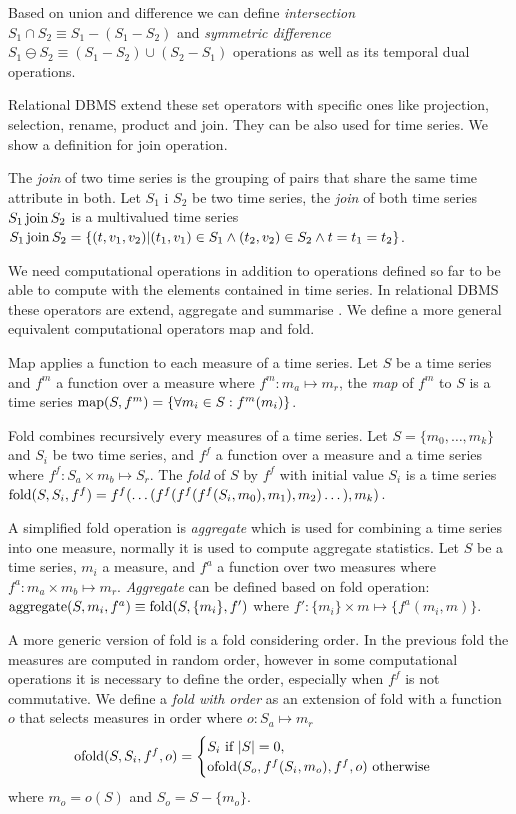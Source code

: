 Based on union and difference we can define \emph{intersection} $S_1\cap
S_2 \equiv S_1 - (S_1 - S_2)$ and \emph{symmetric difference} $S_1 \ominus
S_2 \equiv (S_1 - S_2) \cup (S_2 - S_1)$ operations as well as its
temporal dual operations.


Relational DBMS extend these set operators with specific ones like
projection, selection, rename, product and join. They can be also used
for time series. We show a definition for join operation.


The \emph{join} of two time series is the grouping of pairs that share
the same time attribute in both.  Let $S_1$ i $S_2$ be two time series,
the \emph{join} of both time series $S_1 \operatorname*{join} S_2$ is a multivalued
time series $S_1 \operatorname*{join} S_2 = \{ (t,v_1,v_2) | (t_1,v_1) \in S_1 \wedge
(t_2,v_2) \in S_2 \wedge t=t_1=t_2 \}$.


We need computational operations in addition to operations defined so
far to be able to compute with the elements contained in time
series. In relational DBMS these operators are extend, aggregate and
summarise \cite{date:introduction}. We define a more general
equivalent computational operators map and fold.


Map applies a function to each measure of a time series.  Let $S$ be a
time series and $f^m$ a function over a measure where $f^m:m_a\mapsto
m_r$, the \emph{map} of $f^m$ to $S$ is a time series $\operatorname*{map}(S,f^m) =
\{\forall m_i\in S : f^m(m_i) \}$.

Fold combines recursively every measures of a time series.  Let
$S=\{m_0, \dotsc, m_k\}$ and $S_i$ be two time series, and $f^f$ a
function over a measure and a time series where $f^f: S_a \times m_b
\mapsto S_r$. The \emph{fold} of $S$ by $f^f$ with initial value $S_i$ is a
time series $\operatorname*{fold}(S,S_i,f^f) = f^f(\dots(
f^f(f^f(f^f(S_i,m_0),\allowbreak m_1),\allowbreak m_2
)\dots),\allowbreak m_k)$.


A simplified fold operation is \emph{aggregate} which
is used for combining a time series into one measure, normally it is
used to compute aggregate statistics.  Let $S$ be a time series, $m_i$
a measure, and $f^a$ a function over two measures where $f^a: m_a
\times m_b \mapsto m_r$.  \emph{Aggregate} can be defined based on
fold operation: $\operatorname*{aggregate}(S,m_i,f^a) \equiv \operatorname*{fold}(S,\{m_i\},f')$ where $f':
\{m_i\} \times m \mapsto \{f^a(m_i,m)\}$.

A more generic version of fold is a fold considering order. In the
previous fold the measures are computed in random order, however in
some computational operations it is necessary to define the order,
especially when $f^f$ is not commutative. We define a \emph{fold with
  order} as an extension of fold with a function $o$ that selects
measures in order where $o: S_a \mapsto m_r$
\[
 \operatorname*{ofold}(S,S_i,f^f,o) =
  \begin{cases}
    S_i  \text{ if } |S|=0, \\
    \operatorname*{ofold}(S_o,f^f(S_i,m_o),f^f,o)  \text{ otherwise}
  \end{cases}
\]
 where $m_o = o(S)$ and $S_o = S - \{m_o\}$.


